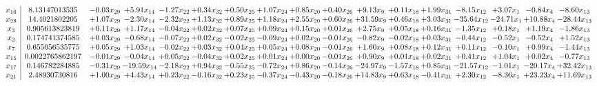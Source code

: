 \documentclass[9pt]{article}
\begin{document}
 \[\begin{array}{c| c c@{\hskip 2pt} c@{\hskip 2pt} c@{\hskip 2pt} c@{\hskip 2pt} c@{\hskip 2pt} c@{\hskip 2pt} c@{\hskip 2pt} c@{\hskip 2pt} c@{\hskip 2pt} c@{\hskip 2pt} c@{\hskip 2pt} c@{\hskip 2pt} c@{\hskip 2pt} c@{\hskip 2pt} c@{\hskip 2pt} }
 x_{16}   &  8.13147013535 & -0.03 x_{29} & +  5.91 x_{14} & -1.27 x_{22} & +  0.34 x_{32} & +  0.50 x_{25} & +  1.07 x_{24} & +  0.85 x_{20} & +  0.40 x_{26} & +  9.13 x_{9} & +  0.11 x_{18} & +  1.99 x_{31} & -8.15 x_{12} & +  3.07 x_{1} & -0.84 x_{4} & -8.60 x_{13}\\
 x_{28}   &  14.4021802205 & +  1.07 x_{29} & -2.30 x_{14} & -2.32 x_{22} & +  1.13 x_{32} & +  0.89 x_{25} & +  1.18 x_{24} & +  2.55 x_{20} & +  0.60 x_{26} & + 31.59 x_{9} & +  0.46 x_{18} & +  3.03 x_{31} & -35.64 x_{12} & -24.71 x_{1} & + 10.88 x_{4} & -28.44 x_{13}\\
 x_{3}   &  0.905613823819 & +  0.11 x_{29} & +  1.17 x_{14} & -0.04 x_{22} & +  0.02 x_{32} & +  0.07 x_{25} & +  0.09 x_{24} & +  0.15 x_{20} & +  0.01 x_{26} & +  2.75 x_{9} & +  0.05 x_{18} & +  0.16 x_{31} & -1.35 x_{12} & +  0.18 x_{1} & +  1.19 x_{4} & -1.86 x_{13}\\
 x_{2}   &  0.174741374585 & +  0.03 x_{29} & -0.68 x_{14} & -0.07 x_{22} & +  0.02 x_{32} & -0.02 x_{25} & -0.09 x_{24} & +  0.02 x_{20} & -0.01 x_{26} & -0.82 x_{9} & -0.02 x_{18} & +  0.03 x_{31} & -0.44 x_{12} & -0.52 x_{1} & -0.52 x_{4} & +  1.52 x_{13}\\
 x_{7}   &  0.655056535775 & +  0.05 x_{29} & +  1.03 x_{14} & -0.02 x_{22} & +  0.03 x_{32} & +  0.04 x_{25} & +  0.05 x_{24} & +  0.08 x_{20} & -0.01 x_{26} & +  1.60 x_{9} & +  0.08 x_{18} & +  0.12 x_{31} & +  0.11 x_{12} & -0.10 x_{1} & +  0.99 x_{4} & -1.44 x_{13}\\
 x_{15}   &  0.0022765862197 & -0.01 x_{29} & -0.04 x_{14} & +  0.05 x_{22} & -0.04 x_{32} & +  0.02 x_{25} & +  0.01 x_{24} & +  0.00 x_{20} & -0.01 x_{26} & +  0.90 x_{9} & +  0.01 x_{18} & +  0.02 x_{31} & +  0.41 x_{12} & +  1.04 x_{1} & +  0.02 x_{4} & -0.77 x_{13}\\
 x_{17}   &  0.146782284885 & -0.31 x_{29} & -19.59 x_{14} & -2.18 x_{22} & +  0.94 x_{32} & -0.55 x_{25} & -0.72 x_{24} & +  0.86 x_{20} & -0.14 x_{26} & -24.97 x_{9} & -1.57 x_{18} & +  0.85 x_{31} & -21.57 x_{12} & -1.01 x_{1} & -20.17 x_{4} & + 32.42 x_{13}\\
 x_{21}   &  2.48930730816 & +  1.00 x_{29} & +  4.43 x_{14} & +  0.23 x_{22} & -0.16 x_{32} & +  0.23 x_{25} & -0.37 x_{24} & -0.43 x_{20} & -0.18 x_{26} & + 14.83 x_{9} & +  0.63 x_{18} & -0.41 x_{31} & +  2.30 x_{12} & -8.36 x_{1} & + 23.23 x_{4} & + 11.69 x_{13}\\

\end{array}\]
\end{document}
